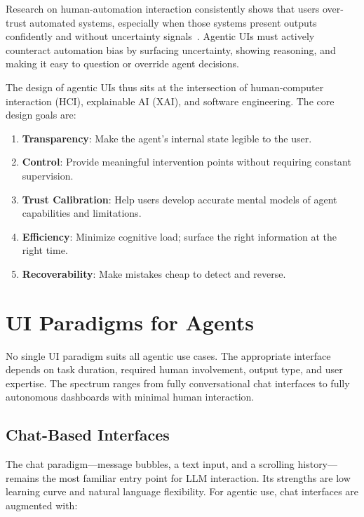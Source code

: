 \begin{warningbox}
Research on human-automation interaction consistently shows that users over-trust automated systems, especially when those systems present outputs confidently and without uncertainty signals~\cite{parasuraman1997humans}. Agentic UIs must actively counteract automation bias by surfacing uncertainty, showing reasoning, and making it easy to question or override agent decisions.
\end{warningbox}

The design of agentic UIs thus sits at the intersection of human-computer interaction (HCI), explainable AI (XAI), and software engineering. The core design goals are:

\begin{enumerate}
  \item \textbf{Transparency}: Make the agent’s internal state legible to the user.
  \item \textbf{Control}: Provide meaningful intervention points without requiring constant supervision.
  \item \textbf{Trust Calibration}: Help users develop accurate mental models of agent capabilities and limitations.
  \item \textbf{Efficiency}: Minimize cognitive load; surface the right information at the right time.
  \item \textbf{Recoverability}: Make mistakes cheap to detect and reverse.
\end{enumerate}

\section{UI Paradigms for Agents}
\label{subsec:ui-paradigms}

No single UI paradigm suits all agentic use cases. The appropriate interface depends on task duration, required human involvement, output type, and user expertise. The spectrum ranges from fully conversational chat interfaces to fully autonomous dashboards with minimal human interaction.

\subsection{Chat-Based Interfaces}
\label{chat-based-interfaces}

The chat paradigm---message bubbles, a text input, and a scrolling history---remains the most familiar entry point for LLM interaction. Its strengths are low learning curve and natural language flexibility. For agentic use, chat interfaces are augmented with:


